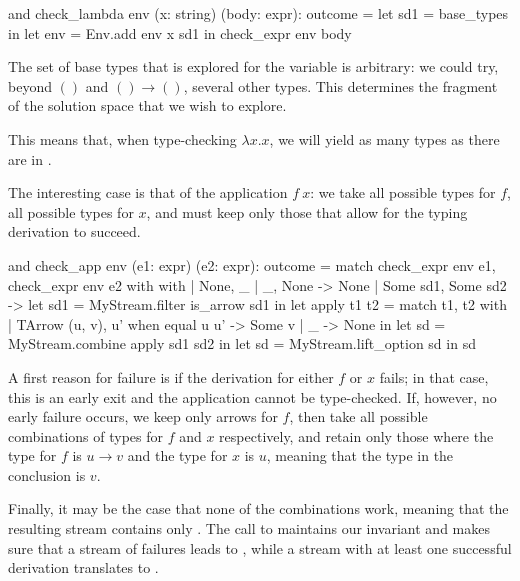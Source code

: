 \begin{ocamlcode}
and check_lambda env (x: string) (body: expr): outcome =
  let sd1 = base_types in
  let env = Env.add env x sd1 in
  check_expr env body
\end{ocamlcode}

The set of base types that is explored for the variable  is arbitrary:
we could try, beyond $()$ and $() \to ()$, several other types. This determines
the fragment of the solution space that we wish to explore.

This means that, when type-checking $\lambda x. x$, we will yield as many types
as there are in .

The interesting case is that of the application $f\ x$: we take all possible
types for $f$, all possible types for $x$, and must keep only those that
allow for the typing derivation to succeed.

\begin{ocamlcode}
and check_app env (e1: expr) (e2: expr): outcome =
  match check_expr env e1, check_expr env e2 with with
  | None, _
  | _, None ->
      None
  | Some sd1, Some sd2 ->
      let sd1 = MyStream.filter is_arrow sd1 in
      let apply t1 t2 =
        match t1, t2 with
        | TArrow (u, v), u' when equal u u' -> Some v
        | _ -> None
      in
      let sd = MyStream.combine apply sd1 sd2 in
      let sd = MyStream.lift_option sd in
      sd
\end{ocamlcode}

A first reason for failure is if the derivation for either $f$ or $x$ fails; in
that case, this is an early exit and the application cannot be type-checked. If,
however, no early failure occurs, we keep only arrows for $f$, then take all
possible combinations of types for $f$ and $x$ respectively, and retain only
those where the type for $f$ is $u \to v$ and the type for $x$ is $u$, meaning
that the type in the conclusion is $v$.

Finally, it may be the case that none of the combinations work, meaning that the
resulting stream contains only . The call to 
maintains our invariant and makes sure that a stream of failures leads to
, while a stream with at least one successful derivation translates
to .
